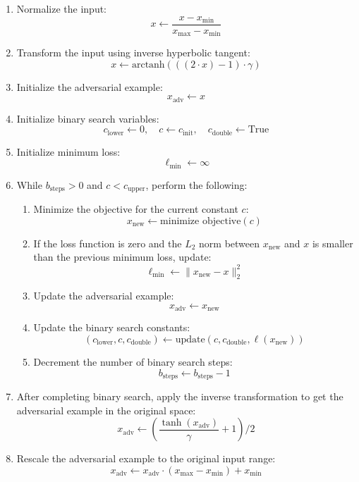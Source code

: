 \begin{enumerate}
    \item Normalize the input:
    \[
    x \leftarrow \frac{x - x_{\text{min}}}{x_{\text{max}} - x_{\text{min}}}
    \]
    \item Transform the input using inverse hyperbolic tangent:
    \[
    x \leftarrow \text{arctanh}\left( ((2 \cdot x) - 1) \cdot \gamma \right)
    \]
    \item Initialize the adversarial example:
    \[
    x_{\text{adv}} \leftarrow x
    \]
    \item Initialize binary search variables:
    \[
    c_{\text{lower}} \leftarrow 0, \quad c \leftarrow c_{\text{init}}, \quad c_{\text{double}} \leftarrow \text{True}
    \]
    \item Initialize minimum loss:
    \[
    \ell_{\text{min}} \leftarrow \infty
    \]
    \item While $b_{\text{steps}} > 0$ and $c < c_{\text{upper}}$, perform the following:
    \begin{enumerate}
        \item Minimize the objective for the current constant $c$:
        \[
        x_{\text{new}} \leftarrow \text{minimize objective}(c)
        \]
        \item If the loss function is zero and the $L_2$ norm between $x_{\text{new}}$ and $x$ is smaller than the previous minimum loss, update:
        \[
        \ell_{\text{min}} \leftarrow \|x_{\text{new}} - x\|_2^2
        \]
        \item Update the adversarial example:
        \[
        x_{\text{adv}} \leftarrow x_{\text{new}}
        \]
        \item Update the binary search constants:
        \[
        (c_{\text{lower}}, c, c_{\text{double}}) \leftarrow \text{update}(c, c_{\text{double}}, \ell(x_{\text{new}}))
        \]
        \item Decrement the number of binary search steps:
        \[
        b_{\text{steps}} \leftarrow b_{\text{steps}} - 1
        \]
    \end{enumerate}
    \item After completing binary search, apply the inverse transformation to get the adversarial example in the original space:
    \[
    x_{\text{adv}} \leftarrow \left( \frac{\tanh(x_{\text{adv}})}{\gamma} + 1 \right) / 2
    \]
    \item Rescale the adversarial example to the original input range:
    \[
    x_{\text{adv}} \leftarrow x_{\text{adv}} \cdot (x_{\text{max}} - x_{\text{min}}) + x_{\text{min}}
    \]
\end{enumerate}


